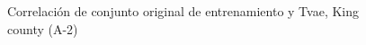 \begin{figure}[H]
    \centering
    
    \caption{Correlación de conjunto original de entrenamiento y Tvae, King county (A-2)}
    \label{pairwise-king county-a-2-tvae}
\end{figure}